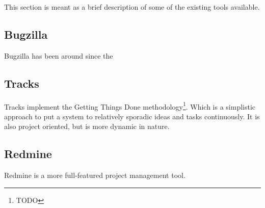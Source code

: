 \documentclass[10pt,a4paper]{article}
\begin{document}
This section is meant as a brief description of some of the existing tools available.
\subsection{Bugzilla}
Bugzilla has been around since the 

\subsection{Tracks}
Tracks implement the Getting Things Done methodology\footnote{TODO}. Which is a simplistic approach to put a system to relatively sporadic ideas and tasks continuously. It is also project oriented, but is more dynamic in nature.

\subsection{Redmine}
Redmine is a more full-featured project management tool.
\end{document}
